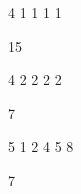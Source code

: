 \documentclass[11pt]{article}
\begin{document}
\begin{inputbox}4
1 1 1 1
\end{inputbox}
\begin{outputbox}15
\end{outputbox}


\begin{inputbox}4
2 2 2 2
\end{inputbox}
\begin{outputbox}7
\end{outputbox}


\begin{inputbox}5
1 2 4 5 8
\end{inputbox}
\begin{outputbox}7
\end{outputbox}
\end{document}
